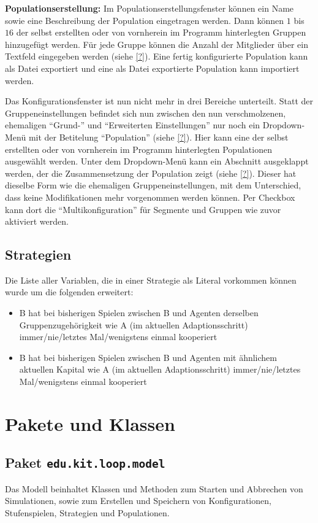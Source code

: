 \documentclass[parskip=full,11pt]{scrartcl}
\begin{document}
\textbf{Populationserstellung:}
Im Populationserstellungsfenster können ein Name sowie eine Beschreibung der Population eingetragen werden. Dann können \(1\) bis \(16\) der selbst erstellten oder von vornherein im Programm hinterlegten Gruppen hinzugefügt werden. Für jede Gruppe können die Anzahl der Mitglieder über ein Textfeld eingegeben werden (siehe \cref{?}). Eine fertig konfigurierte Population kann als Datei exportiert und eine als Datei exportierte Population kann importiert werden.

Das Konfigurationsfenster ist nun nicht mehr in drei Bereiche unterteilt. Statt der Gruppeneinstellungen befindet sich nun zwischen den nun verschmolzenen, ehemaligen \enquote{Grund-} und \enquote{Erweiterten Einstellungen} nur noch ein Dropdown-Menü mit der Betitelung \enquote{Population} (siehe \cref{?}). Hier kann eine der selbst erstellten oder von vornherein im Programm hinterlegten Populationen ausgewählt werden. Unter dem Dropdown-Menü kann ein Abschnitt ausgeklappt werden, der die Zusammensetzung der Population zeigt (siehe \cref{?}). Dieser hat dieselbe Form wie die ehemaligen Gruppeneinstellungen, mit dem Unterschied, dass keine Modifikationen mehr vorgenommen werden können. Per Checkbox kann dort die \enquote{Multikonfiguration} für Segmente und Gruppen wie zuvor aktiviert werden.

\subsection{Strategien}
Die Liste aller Variablen, die in einer Strategie als Literal vorkommen können wurde um die folgenden erweitert:

\begin{itemize}
\item B hat bei bisherigen Spielen zwischen B und Agenten derselben Gruppenzugehörigkeit wie A (im aktuellen Adaptionsschritt) immer/nie/letztes Mal/wenigstens einmal kooperiert
\item B hat bei bisherigen Spielen zwischen B und Agenten mit ähnlichem aktuellen Kapital wie A (im aktuellen Adaptionsschritt) immer/nie/letztes Mal/wenigstens einmal kooperiert
\end{itemize}

\section{Pakete und Klassen}
\subsection{Paket \texttt{edu.kit.loop.model}}
Das Modell beinhaltet Klassen und Methoden zum Starten und Abbrechen von Simulationen, sowie zum Erstellen und Speichern von Konfigurationen, Stufenspielen, Strategien und Populationen.
\end{document}
